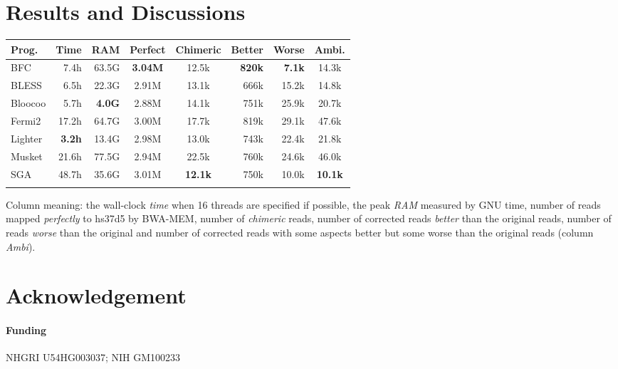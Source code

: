 \documentclass{bioinfo}
\begin{document}
\section{Results and Discussions}
\begin{table}[ht]
{\footnotesize
\begin{tabular}{lrrccrrc}
\toprule
Prog.     & Time & RAM   & Perfect & Chimeric & Better & Worse & Ambi. \\
\midrule
BFC       & 7.4h & 63.5G & {\bf 3.04M} & 12.5k&{\bf 820k}&{\bf 7.1k}&14.3k \\
BLESS     & 6.5h & 22.3G & 2.91M   & 13.1k    & 666k   & 15.2k & 14.8k \\
Bloocoo   &5.7h&{\bf 4.0G}& 2.88M  & 14.1k    & 751k   & 25.9k & 20.7k \\
Fermi2    &17.2h & 64.7G & 3.00M   & 17.7k    & 819k   & 29.1k & 47.6k \\
Lighter   &{\bf 3.2h}& 13.4G&2.98M & 13.0k    & 743k   & 22.4k & 21.8k \\
Musket    &21.6h & 77.5G & 2.94M   & 22.5k    & 760k   & 24.6k & 46.0k \\
SGA       &48.7h & 35.6G & 3.01M  &{\bf 12.1k}& 750k   & 10.0k & {\bf 10.1k} \\
\botrule
\end{tabular}}{Column meaning: the wall-clock \emph{time} when 16 threads
are specified if possible, the peak \emph{RAM} measured by GNU time, number of
reads mapped \emph{perfectly} to hs37d5 by BWA-MEM, number of \emph{chimeric}
reads, number of corrected reads \emph{better} than the original reads, number
of reads \emph{worse} than the original and number of corrected reads with some
aspects better but some worse than the original reads (column \emph{Ambi}).}

\end{table}

\section*{Acknowledgement}
\paragraph{Funding\textcolon} NHGRI U54HG003037; NIH GM100233


\end{document}
